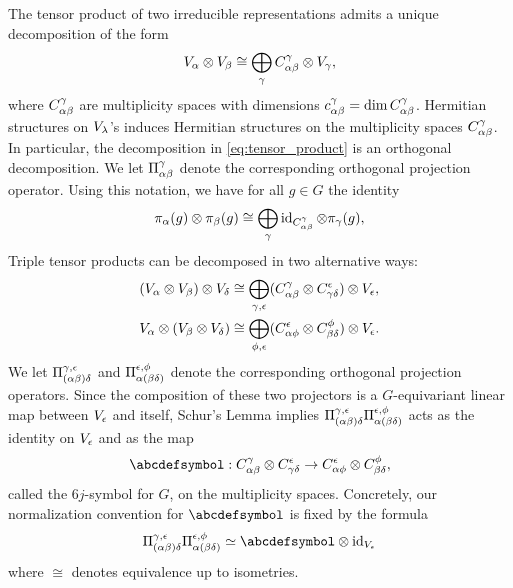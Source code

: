 \documentclass[notitlepage, 11pt, letterpaper]{amsart}
\begin{document}
The tensor product of two irreducible representations admits a unique decomposition of the form
\begin{equation}
    \label{eq:tensor_product}
    V_\alpha \otimes V_\beta \cong \bigoplus_\gamma C_{\alpha \beta}^\gamma \otimes V_\gamma,
\end{equation}
where $C_{\alpha \beta}^\gamma$ are multiplicity spaces with dimensions $c_{\alpha \beta}^\gamma = \dim  C_{\alpha \beta}^\gamma$.
Hermitian structures on $V_\lambda$'s induces  Hermitian structures on the multiplicity spaces $C_{\alpha \beta}^\gamma$.
In particular, the decomposition in \cref{eq:tensor_product} is an orthogonal decomposition.
We let $\Pi_{\alpha \beta}^\gamma$ denote the corresponding orthogonal projection operator.
Using this notation, we have for all $g \in G$ the identity
\begin{equation}
    \label{eq:operator product}
    \pi_\alpha(g) \otimes \pi_\beta(g) \cong \bigoplus_{\gamma} \operatorname{id}_{C_{\alpha \beta}^\gamma} \otimes \pi_\gamma(g),
\end{equation}
Triple tensor products can be decomposed in two alternative ways:
\begin{align}
    \label{eq:triple_tensor_product}
    \begin{split}
        (V_\alpha \otimes V_\beta) \otimes V_\delta
        &\cong \bigoplus_{\gamma, \epsilon} (C_{\alpha \beta}^\gamma \otimes C_{\gamma \delta}^\epsilon) \otimes V_\epsilon,\\
        V_\alpha \otimes (V_\beta \otimes V_\delta)
        &\cong \bigoplus_{\phi, \epsilon} (C_{\alpha \phi}^\epsilon \otimes C_{\beta \delta}^\phi)\otimes V_\epsilon.
    \end{split}
\end{align}
We let $\Pi_{(\alpha \beta) \delta}^{\gamma, \epsilon}$ and $\Pi_{\alpha (\beta \delta)}^{\epsilon, \phi}$ denote the corresponding orthogonal projection operators.
Since the composition of these two projectors is a $G$-equivariant linear map between $V_{\epsilon}$ and itself, Schur's Lemma implies $\Pi_{(\alpha \beta) \delta}^{\gamma, \epsilon} \Pi_{\alpha (\beta \delta)}^{\epsilon, \phi}$ acts as the identity on $V_{\epsilon}$ and as the map
\begin{equation}
   \abcdefsymbol : C_{\ya \yb}^\yc \ot C_{\yc \yd}^\ye \to C_{\ya \yf}^\ye \ot C_{\yb \yd}^\yf,
\end{equation}
called the $6j$-symbol for $G$, on the multiplicity spaces.
Concretely, our normalization convention for $\abcdefsymbol$ is fixed by the formula
\begin{equation}
    \label{eq:prod_proj_6j}
    \projl \projr \simeq
    \abcdefsymbol \ot \id_{V_{\ye}}
\end{equation}
where $\cong$ denotes equivalence up to isometries.
\end{document}
